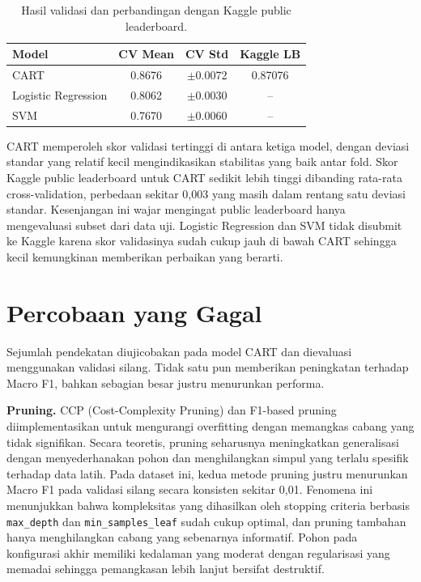 \documentclass{article}
\begin{document}
\begin{table}[h]
    \centering
    \caption{Hasil validasi dan perbandingan dengan Kaggle public leaderboard.}
    \begin{tabular}{lccc}
        \toprule
        \textbf{Model}      & \textbf{CV Mean} & \textbf{CV Std} & \textbf{Kaggle LB} \\
        \midrule
        CART                & 0.8676           & $\pm$0.0072     & 0.87076            \\
        Logistic Regression & 0.8062           & $\pm$0.0030     & --                 \\
        SVM                 & 0.7670           & $\pm$0.0060     & --                 \\
        \bottomrule
    \end{tabular}
\end{table}

CART memperoleh skor validasi tertinggi di antara ketiga model, dengan deviasi standar yang relatif kecil mengindikasikan stabilitas yang baik antar fold. Skor Kaggle public leaderboard untuk CART sedikit lebih tinggi dibanding rata-rata cross-validation, perbedaan sekitar 0,003 yang masih dalam rentang satu deviasi standar. Kesenjangan ini wajar mengingat public leaderboard hanya mengevaluasi subset dari data uji. Logistic Regression dan SVM tidak disubmit ke Kaggle karena skor validasinya sudah cukup jauh di bawah CART sehingga kecil kemungkinan memberikan perbaikan yang berarti.

\section{Percobaan yang Gagal}

Sejumlah pendekatan diujicobakan pada model CART dan dievaluasi menggunakan validasi silang. Tidak satu pun memberikan peningkatan terhadap Macro F1, bahkan sebagian besar justru menurunkan performa.

\textbf{Pruning.} CCP (Cost-Complexity Pruning) dan F1-based pruning diimplementasikan untuk mengurangi overfitting dengan memangkas cabang yang tidak signifikan. Secara teoretis, pruning seharusnya meningkatkan generalisasi dengan menyederhanakan pohon dan menghilangkan simpul yang terlalu spesifik terhadap data latih. Pada dataset ini, kedua metode pruning justru menurunkan Macro F1 pada validasi silang secara konsisten sekitar 0,01. Fenomena ini menunjukkan bahwa kompleksitas yang dihasilkan oleh stopping criteria berbasis \texttt{max\_depth} dan \texttt{min\_samples\_leaf} sudah cukup optimal, dan pruning tambahan hanya menghilangkan cabang yang sebenarnya informatif. Pohon pada konfigurasi akhir memiliki kedalaman yang moderat dengan regularisasi yang memadai sehingga pemangkasan lebih lanjut bersifat destruktif.
\end{document}
